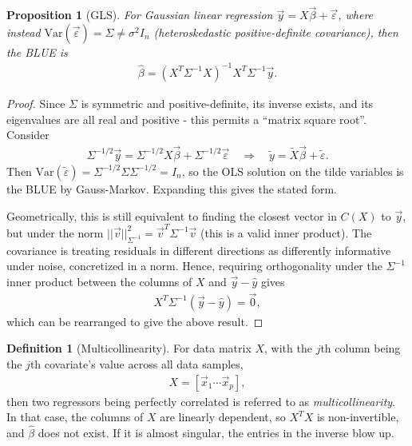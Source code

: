 \documentclass[11pt]{article}
\theoremstyle{definition}
\newtheorem{definition}{Definition}[section]
\theoremstyle{plain}
\newtheorem{proposition}{Proposition}[section]
\theoremstyle{remark}
\newcommand{\Var}{\mathrm{Var}}
\begin{document}
\begin{proposition}[GLS]
    For Gaussian linear regression $\vec{y} = X\vec{\beta} + \vec{\varepsilon}$, where instead $\Var(\vec{\varepsilon})=\Sigma \neq \sigma^2 I_n$ (heteroskedastic positive-definite covariance), then the BLUE is
    \begin{align}
        \hat{\beta} = (X^T\Sigma^{-1}X)^{-1}X^T\Sigma^{-1}\vec{y}.
    \end{align}
\end{proposition}
\begin{proof}
    Since $\Sigma$ is symmetric and positive-definite, its inverse exists, and its eigenvalues are all real and positive - this permits a ``matrix square root''. Consider
    \begin{align}
        \Sigma^{-1/2}\vec{y} = \Sigma^{-1/2}X\vec{\beta} + \Sigma^{-1/2}\vec{\varepsilon} \quad \Rightarrow \quad \tilde{y} = \tilde{X}\vec{\beta} + \tilde{\varepsilon}.
    \end{align}
    Then $\Var(\tilde{\varepsilon}) = \Sigma^{-1/2}\Sigma\Sigma^{-1/2}=I_n$, so the OLS solution on the tilde variables is the BLUE by Gauss-Markov. Expanding this gives the stated form.

    Geometrically, this is still equivalent to finding the closest vector in $C(X)$ to $\vec{y}$, but under the norm $||\vec{v}||^2_{\Sigma^{-1}}=\vec{v}^T\Sigma^{-1}\vec{v}$ (this is a valid inner product). The covariance is treating residuals in different directions as differently informative under noise, concretized in a norm. Hence, requiring orthogonality under the $\Sigma^{-1}$ inner product between the columns of $X$ and $\vec{y} - \hat{y}$ gives
    \begin{align}
        X^T\Sigma^{-1}(\vec{y} - \hat{y})=\vec{0},
    \end{align}
    which can be rearranged to give the above result.
    
\end{proof}

\begin{definition}[Multicollinearity]
    For data matrix $X$, with the $j$th column being the $j$th covariate's value across all data samples,
    \begin{align}
        X = \left[\vec{x}_1 \cdots \vec{x}_p\right],
    \end{align}
    then two regressors being perfectly correlated is referred to as \textit{multicollinearity}. In that case, the columns of $X$ are linearly dependent, so $X^TX$ is non-invertible, and $\hat{\beta}$ does not exist. If it is almost singular, the entries in the inverse blow up.
\end{definition}
\end{document}
